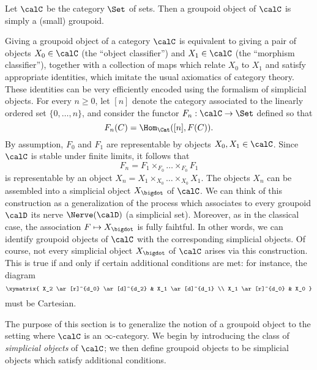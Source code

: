 \begin{example}
Let $\calC$ be the category $\Set$ of sets. Then a groupoid object of $\calC$ is simply a (small) groupoid.
\end{example}

Giving a groupoid object of a category $\calC$ is equivalent to giving a pair of objects $X_0 \in \calC$ (the ``object classifier'') and $X_1 \in \calC$ (the ``morphism classifier''), together with a collection of maps which relate $X_0$ to $X_1$ and satisfy appropriate identities, which imitate the usual axiomatics of category theory. These identities can be very efficiently encoded using the formalism of simplicial objects. For every $n \geq 0$, let
$[n]$ denote the category associated to the linearly ordered set $\{0, \ldots, n \}$, and consider
the functor $F_n: \calC \rightarrow \Set$ defined so that
$$F_n(C) = \Hom_{\Cat}( [n], F(C) ).$$
By assumption, $F_0$ and $F_1$ are representable by objects $X_0, X_1 \in \calC$.
Since $\calC$ is stable under finite limits, it follows that 
$$ F_n = F_1 \times_{F_0} \ldots \times_{F_0} F_1$$
is representable by an object $X_n = X_1 \times_{X_0} \ldots \times_{X_0} X_1$.
The objects $X_{n}$ can be assembled into a simplicial object $X_{\bigdot}$ of
$\calC$. We can think of this construction as a generalization of the process which associates
to every groupoid $\calD$ its nerve $\Nerve(\calD)$ (a simplicial set). Moreover, as in the classical case, the association $F \mapsto X_{\bigdot}$ is fully faihtful. In other words, we can identify groupoid objects of $\calC$ with the corresponding simplicial objects. Of course, not every simplicial object $X_{\bigdot}$ of $\calC$ arises via this construction. This is true if and only if certain additional conditions are met: for instance, the diagram
$$ \xymatrix{ X_2 \ar[r]^{d_0} \ar[d]^{d_2} & X_1 \ar[d]^{d_1} \\
X_1 \ar[r]^{d_0}  & X_0 }$$
must be Cartesian. 

The purpose of this section is to generalize the notion of a groupoid object to the setting where $\calC$ is an $\infty$-category. We begin by introducing the class of {\it simplicial objects} of $\calC$; we then define groupoid objects to be simplicial objects which satisfy additional conditions.

